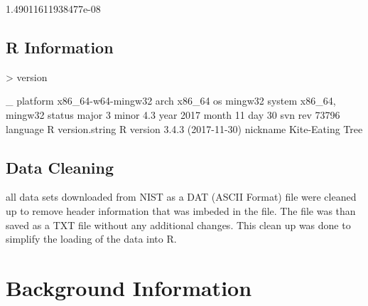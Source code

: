 \documentclass[10pt]{article}
\begin{document}
\begin{Schunk}
\begin{Soutput}
[1] 1.49011611938477e-08
\end{Soutput}
\end{Schunk}
\subsection{R Information}
\begin{Schunk}
\begin{Sinput}
> version
\end{Sinput}
\begin{Soutput}
               _                           
platform       x86_64-w64-mingw32          
arch           x86_64                      
os             mingw32                     
system         x86_64, mingw32             
status                                     
major          3                           
minor          4.3                         
year           2017                        
month          11                          
day            30                          
svn rev        73796                       
language       R                           
version.string R version 3.4.3 (2017-11-30)
nickname       Kite-Eating Tree            
\end{Soutput}
\end{Schunk}
\subsection{Data Cleaning}
all data sets downloaded from NIST as a DAT (ASCII Format) file were cleaned up 
to remove header information that was imbeded in the file. The file was than saved
as a TXT file without any additional changes. This clean up was done to simplify 
the loading of the data into R.

\section{Background Information}
\end{document}
